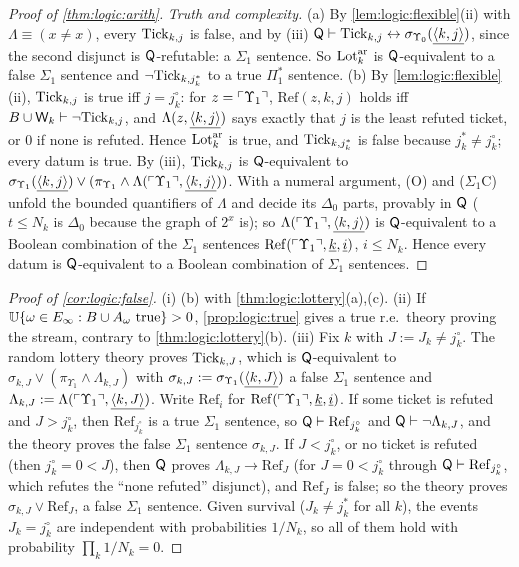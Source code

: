 \begin{proof}[Proof of \cref{thm:logic:arith}]
\emph{Truth and complexity.} (a) By \cref{lem:logic:flexible}(ii) with $\Lambda\equiv(x\ne x)$, every $\mathrm{Tick}_{k,j}$ is false, and by (iii) $\mathsf{Q}\vdash\mathrm{Tick}_{k,j}\leftrightarrow\sigma_{\Upsilon_0}(\underline{\langle k,j\rangle})$, since the second disjunct is $\mathsf{Q}$-refutable: a $\Sigma_1$ sentence. So $\mathrm{Lot}^{\rm ar}_k$ is $\mathsf{Q}$-equivalent to a false $\Sigma_1$ sentence and $\neg\mathrm{Tick}_{k,j^*_k}$ to a true $\Pi_1^*$ sentence. (b) By \cref{lem:logic:flexible}(ii), $\mathrm{Tick}_{k,j}$ is true iff $j=j^\circ_k$: for $z=\ulcorner \Upsilon_1\urcorner$, $\mathrm{Ref}(z,k,j)$ holds iff $B\cup\mathsf{W}_{k}\vdash\neg\mathrm{Tick}_{k,j}$, and $\Lambda(z,\underline{\langle k,j\rangle})$ says exactly that $j$ is the least refuted ticket, or $0$ if none is refuted. Hence $\mathrm{Lot}^{\rm ar}_k$ is true, and $\mathrm{Tick}_{k,j^*_k}$ is false because $j^*_k\ne j^\circ_k$; every datum is true. By (iii), $\mathrm{Tick}_{k,j}$ is $\mathsf{Q}$-equivalent to $\sigma_{\Upsilon_1}(\underline{\langle k,j\rangle})\vee(\pi_{\Upsilon_1}\wedge\Lambda(\ulcorner \Upsilon_1\urcorner,\underline{\langle k,j\rangle}))$. With a numeral argument, (O) and ($\Sigma_1$C) unfold the bounded quantifiers of $\Lambda$ and decide its $\Delta_0$ parts, provably in $\mathsf{Q}$ ($t\le N_k$ is $\Delta_0$ because the graph of $2^x$ is); so $\Lambda(\ulcorner \Upsilon_1\urcorner,\underline{\langle k,j\rangle})$ is $\mathsf{Q}$-equivalent to a Boolean combination of the $\Sigma_1$ sentences $\mathrm{Ref}(\ulcorner \Upsilon_1\urcorner,\underline{k},\underline{i})$, $i\le N_k$. Hence every datum is $\mathsf{Q}$-equivalent to a Boolean combination of $\Sigma_1$ sentences.
\end{proof}

\begin{proof}[Proof of \cref{cor:logic:false}]
(i) (b) with \cref{thm:logic:lottery}(a),(c). (ii) If $\mathbb{U}\{\omega\in E_\infty:B\cup A_\omega\text{ true}\}>0$, \cref{prop:logic:true} gives a true r.e.\ theory proving the stream, contrary to \cref{thm:logic:lottery}(b). (iii) Fix $k$ with $J:=J_k\ne j^\circ_k$. The random lottery theory proves $\mathrm{Tick}_{k,J}$, which is $\mathsf{Q}$-equivalent to $\sigma_{k,J}\vee(\pi_{\Upsilon_1}\wedge\Lambda_{k,J})$ with $\sigma_{k,J}:=\sigma_{\Upsilon_1}(\underline{\langle k,J\rangle})$ a false $\Sigma_1$ sentence and $\Lambda_{k,J}:=\Lambda(\ulcorner \Upsilon_1\urcorner,\underline{\langle k,J\rangle})$. Write $\mathrm{Ref}_i$ for $\mathrm{Ref}(\ulcorner \Upsilon_1\urcorner,\underline{k},\underline{i})$. If some ticket is refuted and $J>j^\circ_k$, then $\mathrm{Ref}_{j^\circ_k}$ is a true $\Sigma_1$ sentence, so $\mathsf{Q}\vdash\mathrm{Ref}_{j^\circ_k}$ and $\mathsf{Q}\vdash\neg\Lambda_{k,J}$, and the theory proves the false $\Sigma_1$ sentence $\sigma_{k,J}$. If $J<j^\circ_k$, or no ticket is refuted (then $j^\circ_k=0<J$), then $\mathsf{Q}$ proves $\Lambda_{k,J}\to\mathrm{Ref}_J$ (for $J=0<j^\circ_k$ through $\mathsf{Q}\vdash\mathrm{Ref}_{j^\circ_k}$, which refutes the ``none refuted'' disjunct), and $\mathrm{Ref}_J$ is false; so the theory proves $\sigma_{k,J}\vee\mathrm{Ref}_J$, a false $\Sigma_1$ sentence. Given survival ($J_k\ne j^*_k$ for all $k$), the events $J_k=j^\circ_k$ are independent with probabilities $1/N_k$, so all of them hold with probability $\prod_k1/N_k=0$.
\end{proof}

